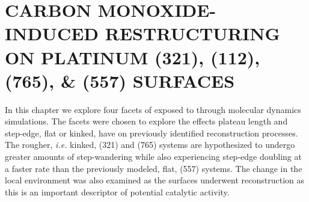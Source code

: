\chapter{CARBON MONOXIDE-INDUCED RESTRUCTURING ON PLATINUM (321), (112), (765), \& (557) SURFACES}
\label{chap:facet}



In this chapter we explore four facets of  exposed to  through
molecular dynamics simulations. The facets were chosen to explore the effects
plateau length and step-edge, flat or kinked, have on previously identified
reconstruction processes. The rougher, {\em i.e.} kinked, (321) and (765)
systems are hypothesized to undergo greater amounts of step-wandering while
also experiencing step-edge doubling at a faster rate than the previously
modeled, flat, (557) systems. The change in the local environment was also
examined as the surfaces underwent reconstruction as this is an important
descriptor of potential catalytic activity. 

